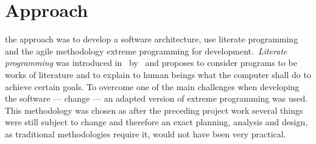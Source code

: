 
\section{Approach}

 the approach was to develop a software
architecture, use literate programming and the agile methodology extreme
programming for development.~\emph{Literate programming} was introduced
in~\citeyear{knuth-lp-1984} by~\citeauthor{knuth-lp-1984} and proposes to
consider programs to be works of literature and to explain to human beings what
the computer shall do to achieve certain goals. To overcome one of the main
challenges when developing the software --- change --- an adapted version of
extreme programming was used. This methodology was chosen as after the preceding
project work several things were still subject to change and therefore an exact
planning, analysis and design, as traditional methodologies require it, would
not have been very practical.